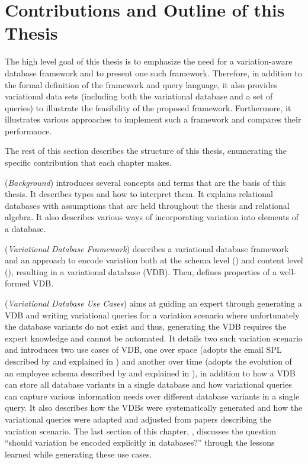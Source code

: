 \section{Contributions and Outline of this Thesis}
\label{sec:contribution}

The high level goal of this thesis is to emphasize the need for a variation-aware database
framework and to present one such framework. Therefore, in addition to the formal 
definition of the framework and query language, it also provides variational data sets 
(including both the variational database and a set of queries) to illustrate the feasibility
of the proposed framework. Furthermore, it illustrates various approaches to implement
such a framework and compares their performance.

The rest of this section describes the structure of this thesis, enumerating the specific 
contribution that each chapter makes. 

 (\emph{Background}) introduces several concepts and terms that are the 
basis of this thesis. It describes types and how to interpret them. It explains relational
databases with assumptions that are held throughout the thesis and relational algebra. 
It also describes various ways of incorporating variation
into elements of a database. 

 (\emph{Variational Database Framework}) describes a variational
database framework and an approach to encode variation both at the schema
level () and content level (), resulting in a variational database
(VDB). Then,  defines properties of a well-formed VDB.


 (\emph{Variational Database Use Cases}) 
aims at guiding an expert through generating a VDB and writing
variational queries for a variation scenario where unfortunately the database variants
do not exist and thus, generating the VDB requires the expert knowledge and cannot
be automated. 
%
It details two such variation scenario and introduces two use cases of VDB, one over space
(adopts the email SPL described by \citet{Hall05} and explained in )
 and another over time (adopts the evolution 
of an employee schema described by \citet{prima08Moon} and explained in ), 
in addition to how a VDB can store all database variants in a single database and
 how variational queries can capture various information needs over different database variants
in a single query. It also describes how  the VDBs were systematically 
generated and how the variational queries
were adapted and adjusted from papers describing the variation scenario. 
%
The last section of this chapter, , discusses the question 
``should variation be encoded explicitly in databases?'' through the lessons learned 
while generating these use cases. 

